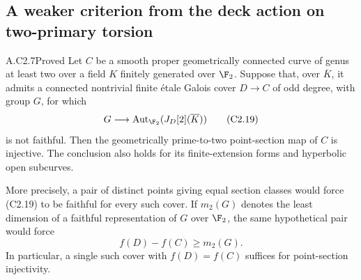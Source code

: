\subsection{A weaker criterion from the deck action on two-primary torsion}

\begin{claim}{A.C2.7}{Proved}
Let $C$ be a smooth proper geometrically connected curve of genus at
least two over a field $K$ finitely generated over $\F_2$. Suppose that,
over $\overline K$, it admits a connected nontrivial finite \'etale
Galois cover $D\to C$ of odd degree, with group $G$, for which
\[
             G\longrightarrow
             \operatorname{Aut}_{\F_2}(J_D[2](\overline K))
                                                               \tag{C2.19}
\]
is not faithful. Then the geometrically prime-to-two point-section
map of $C$ is injective. The conclusion also holds for its
finite-extension forms and hyperbolic open subcurves.

More precisely, a pair of distinct points giving equal section classes
would force (C2.19) to be faithful for every such cover. If
$m_2(G)$ denotes the least dimension of a faithful representation of
$G$ over $\F_2$, the same hypothetical pair would force
\[
                            f(D)-f(C)\ge m_2(G).               \tag{C2.20}
\]
In particular, a single such cover with $f(D)=f(C)$ suffices for
point-section injectivity.
\end{claim}
